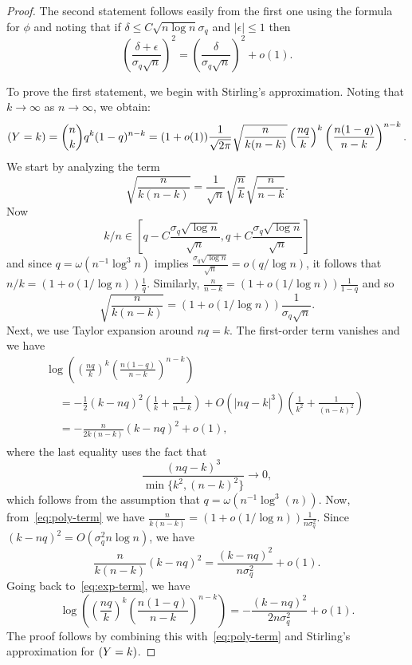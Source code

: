 \documentclass[EJP]{ejpecp}
\newcommand{\1}[1]{\mathbbm{1}_{\{#1\}}}
\newcommand{\eps}{\epsilon}
\let\Pr\relax
\DeclareMathOperator{\Pr}{Pr}
\begin{document}
\begin{proof}
The second statement follows easily from the first one using the formula for $\phi$ and noting that
if $\delta \leq C \sqrt{n \log n} \sigma_q$ and $|\eps| \leq 1$ then
\[
\left(\frac{\delta + \eps}{\sigma_q \sqrt{n}}\right)^2 = \left( \frac{\delta}{\sigma_q \sqrt{n}} \right)^2 + o(1).
\]

To prove the first statement, we begin with Stirling's approximation.
Noting that  $k \to \infty$ as $n \to \infty$, we obtain:
\[
\Pr(Y = k) = \binom{n}{k} q^k(1-q)^{n-k} =
(1+o(1)) \frac{1}{\sqrt{2 \pi}} \sqrt{\frac{n}{k(n-k)}}
\left(\frac{n q}{k}\right)^k \left(\frac{n(1-q)}{n-k}\right)^{n-k}.
\]
We start by analyzing the term
\[
\sqrt{\frac{n}{k(n-k)}} = \frac{1}{\sqrt{n}} \sqrt{\frac{n}{k}} \sqrt{\frac{n}{n-k}}.
\]
Now
\[
k/n \in [q - C \frac{\sigma_q \sqrt{\log n}}{\sqrt{n}}, q+ C\frac{\sigma_q \sqrt{\log n}}{\sqrt{n}}]
\]
and since $q = \omega(n^{-1} \log^3 n)$ implies $\frac{\sigma_q \sqrt{\log n}}{\sqrt{n}} = o(q/\log n)$,
it follows that $n/k = (1+o(1/\log n)) \frac 1q$. Similarly,
$\frac{n}{n-k} = (1 + o(1/\log n)) \frac{1}{1-q}$ and so
\begin{equation}\label{eq:poly-term}
\sqrt{\frac{n}{k(n-k)}} = (1+o(1/\log n)) \frac{1}{\sigma_q \sqrt{n}}.
\end{equation}
Next, we use Taylor expansion around $nq = k$. The first-order term vanishes
and we have
\begin{multline}
\log \left( \left(\frac{n q}{k}\right)^k \left(\frac{n(1-q)}{n-k}\right)^{n-k} \right) \\
\begin{aligned}
 &= -\frac{1}{2} (k-nq)^2 \left(\frac{1}{k} + \frac{1}{n-k}\right)
 + O(|nq-k|^3)\left(\frac{1}{k^2}+\frac{1}{(n-k)^2}\right)
\\ &= - \frac{n}{2k(n-k)} (k-nq)^2 + o(1),
\label{eq:exp-term}
\end{aligned}
\end{multline}
where the last equality uses the fact that
\[
\frac{(nq-k)^3}{\min\{k^2,(n-k)^2\}} \to 0,
\]
which follows from the assumption that $q = \omega(n^{-1}\log^3(n))$.
Now, from~\eqref{eq:poly-term} we have
$\frac{n}{k(n-k)} = (1 + o(1/\log n)) \frac{1}{n \sigma_q^2}$.
Since $(k-nq)^2 = O(\sigma_q^2 n \log n)$, we have
\[
\frac{n}{k(n-k)} (k-nq)^2 = \frac{(k-nq)^2}{n \sigma_q^2} + o(1).
\]
Going back to~\eqref{eq:exp-term}, we have
\[
\log \left( \left(\frac{n q}{k}\right)^k \left(\frac{n(1-q)}{n-k}\right)^{n-k} \right)
= - \frac{(k-nq)^2}{2n\sigma_q^2} + o(1).
\]
The proof follows by combining this with~\eqref{eq:poly-term}
and Stirling's approximation for $\Pr(Y = k)$.
\end{proof}
\end{document}
